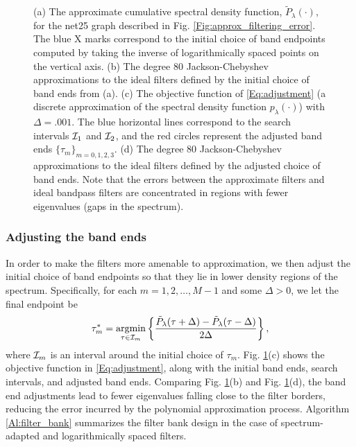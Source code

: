 \documentclass[journal, 10pt]{IEEEtran}
\begin{document}
\begin{figure}[tb]
\caption{{(a) The approximate cumulative spectral density function, $\tilde{P}_{\lambda}(\cdot),$ for the net25 graph described in Fig. \ref{Fig:approx_filtering_error}. The blue X marks correspond to the initial choice of band endpoints computed by taking the inverse of logarithmically spaced points on the vertical axis. (b) The degree 80 Jackson-Chebyshev approximations to the ideal filters defined by the initial choice of band ends from (a). (c) The objective function of \eqref{Eq:adjustment} (a discrete approximation of the spectral density function $p_{\lambda}(\cdot)$) with $\Delta=.001$. The blue horizontal lines correspond to the search intervals ${\cal I}_1$ and ${\cal I}_2$, and the red circles represent the adjusted band ends $\{\tau_m\}_{m=0,1,2,3}$. (d) The degree 80 Jackson-Chebyshev approximations to the ideal filters defined by the adjusted choice of band ends. Note that the errors between the approximate filters and ideal bandpass filters are concentrated in regions with fewer eigenvalues (gaps in the spectrum).}\vspace{-.1in}}\label{Fig:fb_design}
\end{figure}

\subsubsection{Adjusting the band ends} \label{Se:adjust}

In order to make the filters more amenable to approximation, we then adjust the initial choice of band endpoints so that they lie in lower density regions of the spectrum. Specifically, for each $m=1,2,\ldots,M-1$ and some %
 $\Delta>0$, we let the final endpoint be
\begin{align} \label{Eq:adjustment}
\tau_m^* = \argmin_{\tau \in {\cal I}_m} \left\{\frac{\tilde{P}_{\lambda}(\tau+\Delta)-\tilde{P}_{\lambda}(\tau-\Delta)}{2\Delta}\right\},
\end{align}
where ${\cal I}_m$ is an interval around the initial choice of $\tau_m$. Fig. \ref{Fig:fb_design}(c) shows the objective function in \eqref{Eq:adjustment}, along with the initial band ends, search intervals, and adjusted band ends. Comparing Fig. \ref{Fig:fb_design}(b) and Fig. \ref{Fig:fb_design}(d), 
the band end adjustments lead to %
fewer eigenvalues falling 
close to the filter borders, %
reducing the error incurred by the polynomial approximation process. Algorithm \ref{Al:filter_bank} summarizes the %
filter bank design in the case of spectrum-adapted and logarithmically spaced filters.
 
\end{document}
